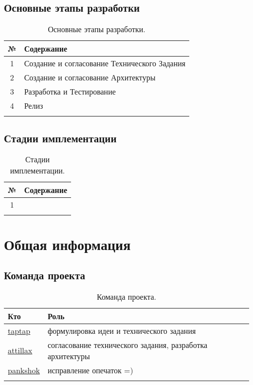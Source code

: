 \documentclass[12pt,a4paper,fullpage,titlepage]{article}
\begin{document}
\subsection{Основные этапы разработки}
\begin{table}[h]
\begin{tabularx}{\textwidth}{|c|X|}
	\hline
	 № & Содержание\\
	\hline
	1 & Создание и согласование Технического Задания\\
	\hline
	2 & Создание и согласование Архитектуры\\
	\hline
	3 & Разработка и Тестирование\\
	\hline
	4 & Релиз\\
	\hline
	 & \\
	\hline
\end{tabularx}
\caption{Основные этапы разработки.}
\end{table}

\subsection{Стадии имплементации}

\begin{table}[h]
\begin{tabularx}{\textwidth}{|c|X|}
	\hline
	№ & Содержание\\
	\hline
	1 & \\
	\hline
	& \\
	\hline
\end{tabularx}
\caption{Стадии имплементации.}
\end{table}

\newpage
\section{Общая информация}
\subsection{Команда проекта}
\begin{table}[h]
	\begin{tabularx}{\textwidth}{|l|X|}
		\hline
		Кто & Роль \\
		\hline
		\href{https://github.com/taptap/}{taptap} & формулировка идеи и технического задания\\
		\hline
		\href{https://github.com/attillax}{attillax} & согласование технического задания, разработка архитектуры\\
		\hline
		\href{https://github.com/pankshok}{pankshok} & исправление опечаток =)\\
		\hline
		& \\
		\hline
	\end{tabularx}
	\caption{Команда проекта.}
\end{table}
\end{document}
